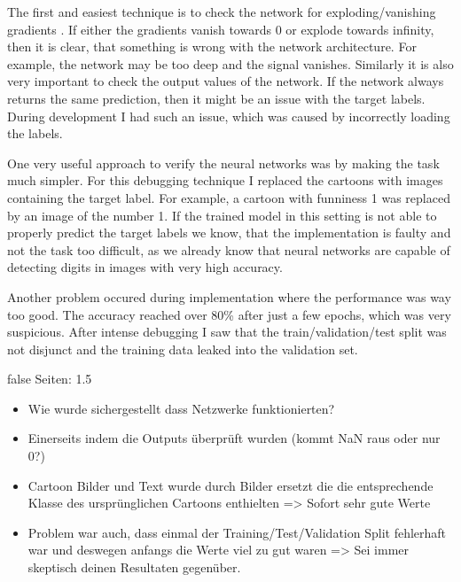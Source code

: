 \documentclass[draft,final,oneside]{vutinfth} %
\begin{document}
The first and easiest technique is to check the network for exploding/vanishing gradients \cite{vanishinggradient}. If either the gradients vanish towards 0 or explode towards infinity, then it is clear, that something is wrong with the network architecture. For example, the network may be too deep and the signal vanishes. Similarly it is also very important to check the output values of the network. If the network always returns the same prediction, then it might be an issue with the target labels. During development I had such an issue, which was caused by incorrectly loading the labels.

One very useful approach to verify the neural networks was by making the task much simpler. For this debugging technique I replaced the cartoons with images containing the target label. For example, a cartoon with funniness 1 was replaced by an image of the number 1. If the trained model in this setting is not able to properly predict the target labels we know, that the implementation is faulty and not the task too difficult, as we already know that neural networks are capable of detecting digits in images with very high accuracy.

Another problem occured during implementation where the performance was way too good. The accuracy reached over 80\% after just a few epochs, which was very suspicious. After intense debugging I saw that the train/validation/test split was not disjunct and the training data leaked into the validation set. 	

\if false
Seiten: 1.5

\begin{itemize}
\item Wie wurde sichergestellt dass Netzwerke funktionierten? 
\item Einerseits indem die Outputs überprüft wurden (kommt NaN raus oder nur 0?)
\item Cartoon Bilder und Text wurde durch Bilder ersetzt die die entsprechende Klasse des ursprünglichen Cartoons enthielten => Sofort sehr gute Werte
\item Problem war auch, dass einmal der Training/Test/Validation Split fehlerhaft war und deswegen anfangs die Werte viel zu gut waren => Sei immer skeptisch deinen Resultaten gegenüber.
\end{itemize}
\fi
\end{document}
